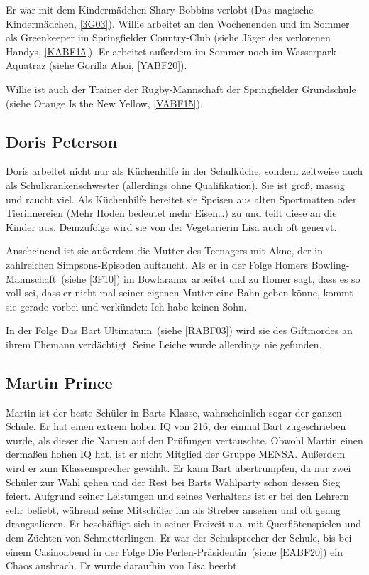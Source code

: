 Er war mit dem Kindermädchen Shary Bobbins verlobt (\glqq Das magische Kindermädchen\grqq , \ref{3G03}). Willie arbeitet an den Wochenenden und im Sommer als Greenkeeper im Springfielder Country-Club (siehe \glqq Jäger des verlorenen Handys\grqq , \ref{KABF15}). Er arbeitet außerdem im Sommer noch im Wasserpark Aquatraz (siehe \glqq Gorilla Ahoi\grqq, \ref{YABF20}).

Willie ist auch der Trainer der Rugby-Mannschaft der Springfielder Grundschule (siehe \glqq Orange Is the New Yellow\grqq , \ref{VABF15}).


\subsection{Doris Peterson}\label{KuechenhilfeDoris}
Doris arbeitet nicht nur als Küchenhilfe in der Schulküche, sondern zeitweise auch als Schulkrankenschwester (allerdings ohne Qualifikation). Sie ist groß, massig und raucht viel. Als Küchenhilfe bereitet sie Speisen aus alten Sportmatten oder Tierinnereien (\glqq Mehr Hoden bedeutet mehr Eisen\dots \grqq ) zu und teilt diese an die Kinder aus. Demzufolge wird sie von der Vegetarierin Lisa auch oft genervt.

Anscheinend ist sie außerdem die Mutter des Teenagers mit Akne, der in zahlreichen Simpsons-Episoden auftaucht. Als er in der Folge \glqq Homers Bowling-Mannschaft\grqq\ (siehe \ref{3F10}) im \glqq Bowlarama\grqq\ arbeitet und zu Homer sagt, dass es so voll sei, dass er nicht mal seiner eigenen Mutter eine Bahn geben könne, kommt sie gerade vorbei und verkündet: \glqq Ich habe keinen Sohn.\grqq 

In der Folge \glqq Das Bart Ultimatum\grqq\ (siehe \ref{RABF03}) wird sie des Giftmordes an ihrem Ehemann verdächtigt. Seine Leiche wurde allerdings nie gefunden.

\subsection{Martin Prince}\label{MartinPrince}
Martin ist der beste Schüler in Barts Klasse, wahrscheinlich sogar der ganzen Schule. Er hat einen extrem hohen IQ von 216, der einmal Bart zugeschrieben wurde, als dieser die Namen auf den Prüfungen vertauschte. Obwohl Martin einen dermaßen hohen IQ hat, ist er nicht Mitglied der Gruppe MENSA. Außerdem wird er zum Klassensprecher gewählt. Er kann Bart übertrumpfen, da nur zwei Schüler zur Wahl gehen und der Rest bei Barts Wahlparty schon dessen Sieg feiert. Aufgrund seiner Leistungen und seines Verhaltens ist er bei den Lehrern sehr beliebt, während seine Mitschüler ihn als Streber ansehen und oft genug drangsalieren. Er beschäftigt sich in seiner Freizeit u.a. mit Querflötenspielen und dem Züchten von Schmetterlingen. Er war der Schulsprecher der Schule, bis bei einem Casinoabend in der Folge \glqq Die Perlen-Präsidentin\grqq\ (siehe \ref{EABF20}) ein Chaos ausbrach. Er wurde daraufhin von Lisa beerbt.

